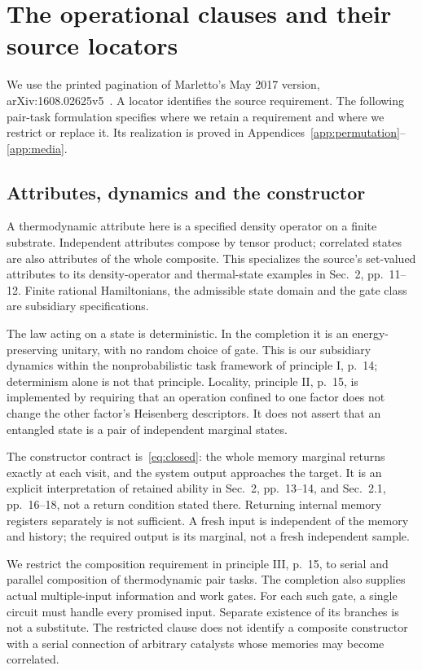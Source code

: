\section{The operational clauses and their source locators}\label{app:clauses}
We use the printed pagination of Marletto's May 2017 version, arXiv:1608.02625v5~\cite{marletto}. A locator identifies the source requirement. The following pair-task formulation specifies where we retain a requirement and where we restrict or replace it. Its realization is proved in Appendices~\ref{app:permutation}--\ref{app:media}.

\subsection{Attributes, dynamics and the constructor}
A thermodynamic attribute here is a specified density operator on a finite substrate. Independent attributes compose by tensor product; correlated states are also attributes of the whole composite. This specializes the source's set-valued attributes to its density-operator and thermal-state examples in Sec.~2, pp.~11--12. Finite rational Hamiltonians, the admissible state domain and the gate class are subsidiary specifications.

The law acting on a state is deterministic. In the completion it is an energy-preserving unitary, with no random choice of gate. This is our subsidiary dynamics within the nonprobabilistic task framework of principle I, p.~14; determinism alone is not that principle. Locality, principle II, p.~15, is implemented by requiring that an operation confined to one factor does not change the other factor's Heisenberg descriptors. It does not assert that an entangled state is a pair of independent marginal states.

The constructor contract is~\eqref{eq:closed}: the whole memory marginal returns exactly at each visit, and the system output approaches the target. It is an explicit interpretation of retained ability in Sec.~2, pp.~13--14, and Sec.~2.1, pp.~16--18, not a return condition stated there. Returning internal memory registers separately is not sufficient. A fresh input is independent of the memory and history; the required output is its marginal, not a fresh independent sample.

We restrict the composition requirement in principle III, p.~15, to serial and parallel composition of thermodynamic pair tasks. The completion also supplies actual multiple-input information and work gates. For each such gate, a single circuit must handle every promised input. Separate existence of its branches is not a substitute. The restricted clause does not identify a composite constructor with a serial connection of arbitrary catalysts whose memories may become correlated.

